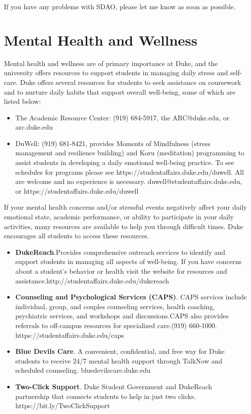 \documentclass[12pt]{article}
\begin{document}
If you have any problems with SDAO, please let me know as soon as possible.


\section{Mental Health and Wellness}

Mental health and wellness are of primary importance at Duke, and the university offers resources to support students in managing daily stress and self-care. Duke offers several resources for students to seek assistance on coursework and to nurture daily habits that support overall well-being, some of which are listed below:

\begin{itemize}
	\item The Academic Resource Center: (919) 684-5917, the ARC@duke.edu, or arc.duke.edu
	\item DuWell: (919) 681-8421, provides Moments of Mindfulness (stress management and resilience building) and Koru (meditation) programming to assist students in developing a daily emotional well-being practice. To see schedules for programs please see https://studentaffairs.duke.edu/duwell. All are welcome and no experience is necessary. duwell@studentaffairs.duke.edu, or https://studentaffairs.duke.edu/duwell
\end{itemize}

If your mental health concerns and/or stressful events negatively affect your daily emotional state, academic performance, or ability to participate in your daily activities, many resources are available to help you through difficult times. Duke encourages all students to access these resources.

\begin{itemize}
	\item \textbf{DukeReach}.Provides comprehensive outreach services to identify and support students in managing all aspects of well-being. If you have concerns about a student's behavior or health visit the website for resources and assistance.http://studentaffairs.duke.edu/dukereach
	\item \textbf{Counseling and Psychological Services (CAPS)}. CAPS services include individual, group, and couples counseling services, health coaching, psychiatric services, and workshops and discussions.CAPS also provides referrals to off-campus resources for specialized care.(919) 660-1000. https://studentaffairs.duke.edu/caps
	\item \textbf{Blue Devils Care}. A convenient, confidential, and free way for Duke students to receive 24/7 mental health support through TalkNow and scheduled counseling. bluedevilscare.duke.edu
	\item \textbf{Two-Click Support}. Duke Student Government and DukeReach partnership that connects students to help in just two clicks.  https://bit.ly/TwoClickSupport
\end{itemize}
\end{document}
